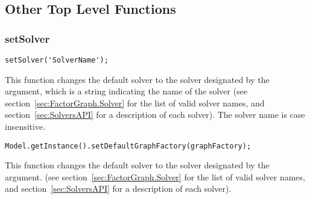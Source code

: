 \subsection{Other Top Level Functions}

\subsubsection{setSolver}

\ifmatlab
\begin{lstlisting}
setSolver('SolverName');
\end{lstlisting}

This function changes the default solver to the solver designated by the argument, which is a string indicating the name of the solver (see section~\ref{sec:FactorGraph.Solver} for the list of valid solver names, and section~\ref{sec:SolversAPI} for a description of each solver).  The solver name is case insensitive.
\fi

\ifjava
\begin{lstlisting}
Model.getInstance().setDefaultGraphFactory(graphFactory);
\end{lstlisting}

This function changes the default solver to the solver designated by the argument.   (see section~\ref{sec:FactorGraph.Solver} for the list of valid solver names, and section~\ref{sec:SolversAPI} for a description of each solver).  
\fi


%
%
%
%
%
%
%
%
